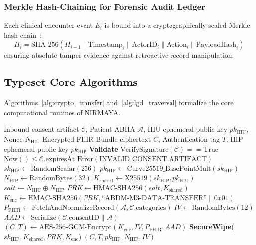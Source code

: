 \documentclass[journal,twocolumn]{IEEEtran}
\begin{document}
\subsubsection{Merkle Hash-Chaining for Forensic Audit Ledger}
Each clinical encounter event $E_i$ is bound into a cryptographically sealed Merkle hash chain~\cite{merkle_tree}:
\begin{equation}
    H_i = \text{SHA-256}(H_{i-1} \parallel \text{Timestamp}_i \parallel \text{ActorID}_i \parallel \text{Action}_i \parallel \text{PayloadHash}_i)
\end{equation}
ensuring absolute tamper-evidence against retroactive record manipulation.

\subsection{Typeset Core Algorithms}

Algorithms~\ref{alg:crypto_transfer} and~\ref{alg:lgd_traversal} formalize the core computational routines of NIRMAYA.

\begin{algorithm}[t]
\caption{Asynchronous Curve25519-HKDF-AES256 Encrypted Health Information Transfer Protocol}
\label{alg:crypto_transfer}
\begin{algorithmic}[1]
\REQUIRE Inbound consent artifact $\mathcal{C}$, Patient ABHA $\mathcal{A}$, HIU ephemeral public key $pk_{\text{HIU}}$, Nonce $N_{\text{HIU}}$
\ENSURE Encrypted FHIR Bundle ciphertext $C$, Authentication tag $T$, HIP ephemeral public key $pk_{\text{HIP}}$
\STATE \textbf{Validate} $\text{VerifySignature}(\mathcal{C}) == \text{True}$ \AND $\text{Now}() \le \mathcal{C}.\text{expiresAt}$
    \RETURN $\text{Error}(\text{INVALID\_CONSENT\_ARTIFACT})$
\ENDIF
\STATE $sk_{\text{HIP}} \leftarrow \text{RandomScalar}(256)$
\STATE $pk_{\text{HIP}} \leftarrow \text{Curve25519\_BasePointMult}(sk_{\text{HIP}})$
\STATE $N_{\text{HIP}} \leftarrow \text{RandomBytes}(32)$
\STATE $K_{\text{shared}} \leftarrow \text{X25519}(sk_{\text{HIP}}, pk_{\text{HIU}})$
\STATE $salt \leftarrow N_{\text{HIU}} \oplus N_{\text{HIP}}$
\STATE $PRK \leftarrow \text{HMAC-SHA256}(salt, K_{\text{shared}})$
\STATE $K_{\text{enc}} \leftarrow \text{HMAC-SHA256}(PRK, \text{``ABDM-M3-DATA-TRANSFER''} \parallel 0x01)$
\STATE $P_{\text{FHIR}} \leftarrow \text{FetchAndNormalizeRecord}(\mathcal{A}, \mathcal{C}.\text{categories})$
\STATE $IV \leftarrow \text{RandomBytes}(12)$
\STATE $AAD \leftarrow \text{Serialize}(\mathcal{C}.\text{consentID} \parallel \mathcal{A})$
\STATE $(C, T) \leftarrow \text{AES-256-GCM-Encrypt}(K_{\text{enc}}, IV, P_{\text{FHIR}}, AAD)$
\STATE \textbf{SecureWipe}($sk_{\text{HIP}}, K_{\text{shared}}, PRK, K_{\text{enc}}$)
\RETURN $(C, T, pk_{\text{HIP}}, N_{\text{HIP}}, IV)$
\end{algorithmic}
\end{algorithm}
\end{document}
